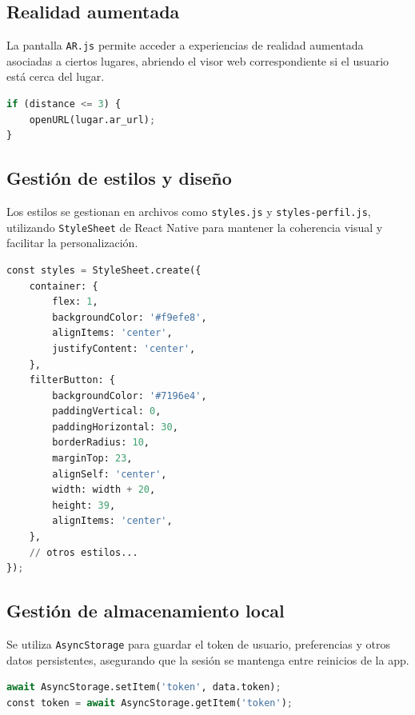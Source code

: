 \subsection{Realidad aumentada}

La pantalla \texttt{AR.js} permite acceder a experiencias de realidad aumentada asociadas a ciertos lugares, abriendo el visor web correspondiente si el usuario está cerca del lugar.

\begin{lstlisting}[language=Python, caption={Acceso a AR}]
if (distance <= 3) {
    openURL(lugar.ar_url);
}
\end{lstlisting}

\subsection{Gestión de estilos y diseño}

Los estilos se gestionan en archivos como \texttt{styles.js} y \texttt{styles-perfil.js}, utilizando \texttt{StyleSheet} de React Native para mantener la coherencia visual y facilitar la personalización.

\begin{lstlisting}[language=Python, caption={Ejemplo de estilos en styles.js}]
const styles = StyleSheet.create({
    container: {
        flex: 1,
        backgroundColor: '#f9efe8',
        alignItems: 'center',
        justifyContent: 'center',
    },
    filterButton: {
        backgroundColor: '#7196e4',
        paddingVertical: 0,
        paddingHorizontal: 30,
        borderRadius: 10,
        marginTop: 23,
        alignSelf: 'center',
        width: width + 20,
        height: 39,
        alignItems: 'center',
    },
    // otros estilos...
});
\end{lstlisting}

\subsection{Gestión de almacenamiento local}

Se utiliza \texttt{AsyncStorage} para guardar el token de usuario, preferencias y otros datos persistentes, asegurando que la sesión se mantenga entre reinicios de la app.

\begin{lstlisting}[language=Python, caption={Uso de AsyncStorage}]
await AsyncStorage.setItem('token', data.token);
const token = await AsyncStorage.getItem('token');
\end{lstlisting}

